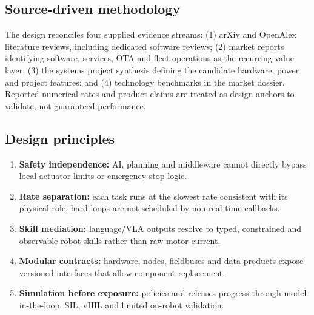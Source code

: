 \documentclass[10pt,a4paper]{article}
\begin{document}
\subsection{Source-driven methodology}
The design reconciles four supplied evidence streams: (1) arXiv and OpenAlex literature reviews, including dedicated software reviews; (2) market reports identifying software, services, OTA and fleet operations as the recurring-value layer; (3) the systems project synthesis defining the candidate hardware, power and project features; and (4) technology benchmarks in the market dossier. Reported numerical rates and product claims are treated as design anchors to validate, not guaranteed performance.

\subsection{Design principles}
\begin{enumerate}[leftmargin=1.5em]
\item \textbf{Safety independence:} AI, planning and middleware cannot directly bypass local actuator limits or emergency-stop logic.
\item \textbf{Rate separation:} each task runs at the slowest rate consistent with its physical role; hard loops are not scheduled by non-real-time callbacks.
\item \textbf{Skill mediation:} language/VLA outputs resolve to typed, constrained and observable robot skills rather than raw motor current.
\item \textbf{Modular contracts:} hardware, nodes, fieldbuses and data products expose versioned interfaces that allow component replacement.
\item \textbf{Simulation before exposure:} policies and releases progress through model-in-the-loop, SIL, vHIL and limited on-robot validation.
\end{enumerate}
\end{document}
